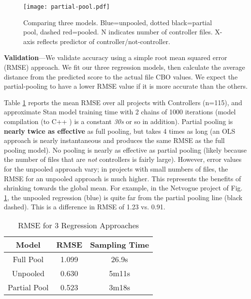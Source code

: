 \documentclass[sigconf,natbib=false]{acmart}
\begin{document}
\begin{figure}[tb]
	\centering
	\texttt{[image: partial-pool.pdf]}
  \caption{Comparing three models. Blue=unpooled, dotted black=partial pool, dashed red=pooled.
   N indicates number of controller files. X-axis reflects predictor of controller/not-controller.}
	\label{fig:partial-pool}
\end{figure}

\noindent\textbf{Validation}---We validate accuracy using a simple root mean
squared error (RMSE) approach.%
We fit our three regression models, then calculate the average distance from the
predicted score to the actual file CBO values. We expect the partial-pooling to
have a lower RMSE value if it is more accurate than the others.

Table \ref{tbl:rmse} reports the mean RMSE over all projects with Controllers
(n=115), and approximate Stan model training time with 2 chains of 1000
iterations (model compilation (to C++	) is a constant \emph{30s} or so in
addition). Partial pooling is \textbf{nearly twice as effective} as full
pooling, but takes 4 times as long (an OLS approach is nearly instantaneous and
produces the same RMSE as the full pooling model). No pooling is nearly as
effective as partial pooling (likely because the number of files that are
\emph{not} controllers is fairly large). However, error values for the unpooled
approach vary; in projects with small numbers of files, the RMSE for an unpooled
approach is much higher. This represents the benefits of shrinking towards the
global mean. For example, in the Netvogue project of Fig.
\ref{fig:partial-pool}, the unpooled regression (blue) is quite far from the
partial pooling line (black dashed). This is a difference in RMSE of
1.23 vs. 0.91.

\begin{table}
\begin{tabular}{c|c|c}
\toprule
Model 			& RMSE 	& Sampling Time \\ %
\midrule
Full Pool 		& 1.099 & 26.9s \\ %
Unpooled 		& 0.630 & 5m11s \\ %
Partial Pool 	& 0.523 & 3m18s \\ %
\bottomrule
\end{tabular}
\caption{RMSE for 3 Regression Approaches}
\label{tbl:rmse}
\end{table}
\end{document}
